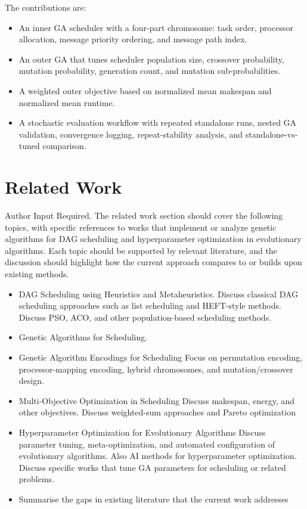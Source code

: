 \documentclass{ieeeaccess}
\begin{document}
The contributions are:
\begin{itemize}
    \item An inner GA scheduler with a four-part chromosome: task order, processor allocation, message priority ordering, and message path index.
    \item An outer GA that tunes scheduler population size, crossover probability, mutation probability, generation count, and mutation sub-probabilities.
    \item A weighted outer objective based on normalized mean makespan and normalized mean runtime.
    \item A stochastic evaluation workflow with repeated standalone runs, nested GA validation, convergence logging, repeat-stability analysis, and standalone-vs-tuned comparison.
\end{itemize}

\section{Related Work}
\label{sec:related_work}

Author Input Required. The related work section should cover the following topics, with specific references to works that implement or analyze genetic algorithms for DAG scheduling and hyperparameter optimization in evolutionary algorithms. Each topic should be supported by relevant literature, and the discussion should highlight how the current approach compares to or builds upon existing methods.

\begin{itemize}
\item DAG Scheduling using Heuristics and Metaheuristics.
Discuss classical DAG scheduling approaches such as list scheduling and HEFT-style methods.
Discuss PSO, ACO, and other population-based scheduling methods.

\item Genetic Algorithms for Scheduling. 

\item Genetic Algorithm Encodings for Scheduling
Focus on permutation encoding, processor-mapping encoding, hybrid chromosomes, and mutation/crossover design.

\item Multi-Objective Optimization in Scheduling
Discuss makespan, energy, and other objectives. Discuss weighted-sum approaches and Pareto optimization


\item Hyperparameter Optimization for Evolutionary Algorithms
Discuss parameter tuning, meta-optimization, and automated configuration of evolutionary algorithms. Also AI methods for hyperparameter optimization.
Discuss specific works that tune GA parameters for scheduling or related problems.

\item Summarise the gaps in existing literature that the current work addresses 

\end{itemize}
\end{document}
